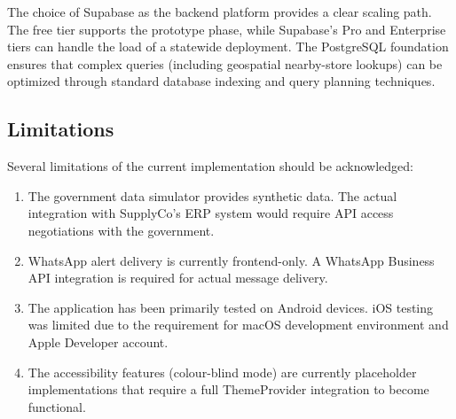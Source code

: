 The choice of Supabase as the backend platform provides a clear scaling path. The free tier supports the prototype phase, while Supabase's Pro and Enterprise tiers can handle the load of a statewide deployment. The PostgreSQL foundation ensures that complex queries (including geospatial nearby-store lookups) can be optimized through standard database indexing and query planning techniques.

\subsection{Limitations}

Several limitations of the current implementation should be acknowledged:

\begin{enumerate}
    \item The government data simulator provides synthetic data. The actual integration with SupplyCo's ERP system would require API access negotiations with the government.

    \item WhatsApp alert delivery is currently frontend-only. A WhatsApp Business API integration is required for actual message delivery.

    \item The application has been primarily tested on Android devices. iOS testing was limited due to the requirement for macOS development environment and Apple Developer account.

    \item The accessibility features (colour-blind mode) are currently placeholder implementations that require a full ThemeProvider integration to become functional.
\end{enumerate}
